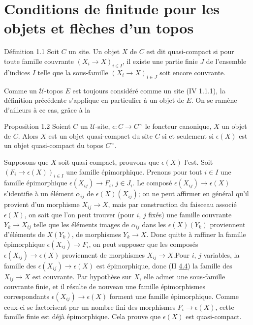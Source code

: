 \section{Conditions de finitude pour les objets et flèches d'un
  topos}

\begin{enonce*}{Définition 1.1}
Soit $C$ un site. Un objet $X$ de $C$ est dit quasi-compact si pour
toute famille couvrante $(X_i \to X)_{i\in I}$, il existe une partie
finie $J$ de l'ensemble d'indices $I$ telle que la sous-famille $(X_i
\to X)_{i \in J}$ soit encore couvrante.
\end{enonce*}

Comme un $𝒰$-topos $E$ est toujours considéré comme un site
(IV 1.1.1), la définition précédente s'applique en particulier à un
objet de $E$. On se ramène d'ailleurs à ce cas, grâce à la

\begin{enonce*}{Proposition 1.2}
Soient $C$ un $𝒰$-site, $\epsilon : C \to C^{\sim}$ le foncteur
canonique, $X$ un objet de $C$. Alors $X$ est un objet quasi-compact
du site $C$ si et seulement si $\epsilon(X)$ est un objet
quasi-compact du topos $C^{\sim}$.
\end{enonce*}

Supposons que $X$ soit quasi-compact, prouvons que $\epsilon(X)$
l'est. Soit $(F_i \to \epsilon(X))_{i \in I}$ une famille
épimorphique. Prenons pour tout $i \in I$ une famille épimorphique
$\epsilon(X_{ij}) \to F_i$, $j \in J_i$. Le composé $\epsilon(X_{ij})
\to \epsilon(X)$ s'identifie à un élément $\alpha_{ij}$ de
$\epsilon(X)(X_{ij})$; on ne peut affirmer en général qu'il provient
d'un morphisme $X_{ij} \to X$, mais par construction du faisceau
associé $\epsilon(X)$, on sait que l'on peut trouver (pour $i$, $j$
fixés) une famille couvrante $Y_k \to X_{ij}$ telle que les éléments
images de $\alpha_{ij}$ dans les $\epsilon(X)(Y_k)$ proviennent
d'éléments de $X(Y_k)$, \ie de morphismes $Y_k \to X$. Donc quitte à
raffiner la famille épimorphique $\epsilon(X_{ij}) \to F_i$, on peut
supposer que les composés $\epsilon(X_{ij}) \to \epsilon(X)$
proviennent de morphismes $X_{ij} \to X$.\pageoriginale Pour $i$, $j$
variables, la famille des $\epsilon(X_{ij}) \to \epsilon(X)$ est épimorphique, donc
(II \hyperref[VI.cor4.4]{4.4}) la famille des $X_{ij} \to X$ est couvrante. Par hypothèse sur
$X$, elle admet une sous-famille couvrante finie, et il résulte de
nouveau une famille épimorphismes correspondants $\epsilon(X_{ij}) \to
\epsilon(X)$ forment une famille épimorphique. Comme ceux-ci se
factorisent par un nombre fini des morphismes $F_i \to \epsilon(X)$,
cette famille finie est déjà épimorphique. Cela prouve que
$\epsilon(X)$ est quasi-compact.

